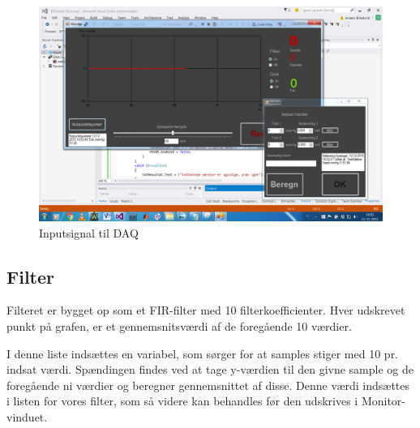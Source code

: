 \begin{figure}[H]
	\centering
	\includegraphics[width=1\textwidth]{Figurer/Test_Nul_3}
	\caption{Inputsignal til DAQ}
\end{figure}









\subsection{Filter}



Filteret er bygget op som et FIR-filter med 10 filterkoefficienter. Hver udskrevet punkt på grafen, er et gennemsnitsværdi af de foregående 10 værdier.


I denne liste indsættes en variabel, som sørger for at samples stiger med 10 pr. indsat værdi. Spændingen findes ved at tage y-værdien til den givne sample og de foregående ni værdier og beregner gennemsnittet af disse. Denne værdi indsættes i listen for vores filter, som så videre kan behandles før den udskrives i Monitor-vinduet.

